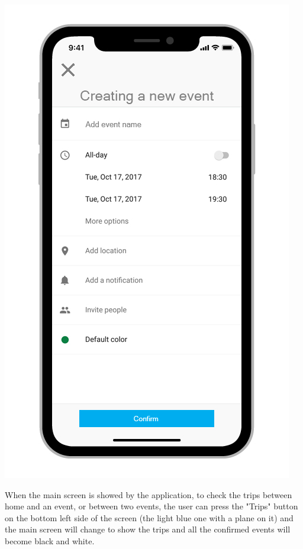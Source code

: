 \begin{center}
\includegraphics[scale=2.4]{MainMatter/images/ui/newevent}
\end{center}
When the main screen is showed by the application, to check the trips between home and an event, or between two events, the user can press the "Trips" button on the bottom left side of the screen (the light blue one with a plane on it) and the main screen will change to show the trips and all the confirmed events will become black and white.
